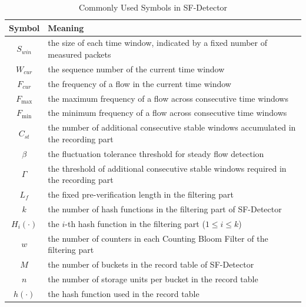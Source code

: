 \documentclass[preprint,12pt]{elsarticle}
\begin{document}
\begin{table}[htbp]
\caption{Commonly Used Symbols in SF-Detector}
\begin{center}
\small
\setlength{\tabcolsep}{5pt}
\begin{tabular}{c>{\raggedright\arraybackslash}p{5.8cm}}
\toprule
\textbf{Symbol} & \textbf{Meaning} \\
\midrule
$S_{win}$ & the size of each time window, indicated by a fixed number of measured packets \\
$W_{cur}$ & the sequence number of the current time window \\
$F_{cur}$ & the frequency of a flow in the current time window \\
$F_{\max}$ & the maximum frequency of a flow across consecutive time windows \\
$F_{\min}$ & the minimum frequency of a flow across consecutive time windows \\
$C_{st}$ & the number of additional consecutive stable windows accumulated in the recording part \\
$\beta$ & the fluctuation tolerance threshold for steady flow detection \\
$\Gamma$ & the threshold of additional consecutive stable windows required in the recording part \\
$L_f$ & the fixed pre-verification length in the filtering part \\
$k$ & the number of hash functions in the filtering part of SF-Detector \\
$H_i(\cdot)$ & the $i$-th hash function in the filtering part ($1 \le i \le k$) \\
$w$ & the number of counters in each Counting Bloom Filter of the filtering part \\
$M$ & the number of buckets in the record table of SF-Detector \\
$n$ & the number of storage units per bucket in the record table \\
$h(\cdot)$ & the hash function used in the record table \\
\bottomrule
\end{tabular}
\label{tab:symbols}
\end{center}
\end{table}
\end{document}
